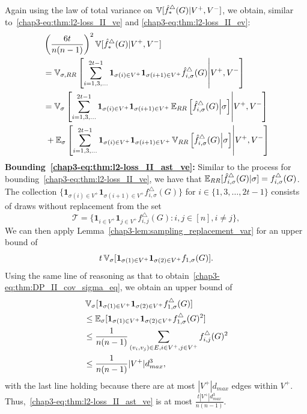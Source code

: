 Again using the law of total variance on $\operatorname{\mathbb{V}}[\hat{f}_*^\triangle(G)|V^+,V^-]$, we
obtain, similar to~\eqref{chap3-eq:thm:l2-loss_II_ve} and \eqref{chap3-eq:thm:l2-loss_II_ev}:
\begin{align}
  &\left(\frac{6t}{n(n-1)}\right)^2\operatorname{\mathbb{V}}[\hat{f}_*^\triangle(G)|V^+,V^-] \nonumber \\
  &=\operatorname{\mathbb{V}}_{\sigma,RR}\left[\sum_{i=1,3,\ldots}^{2t-1} \textbf{1}_{\sigma(i)\in
  V^+}\textbf{1}_{\sigma(i+1) \in V^+} \hat{f}_{i,\sigma}^\triangle(G)\middle| V^+,V^-\right] \nonumber \\
  &=\operatorname{\mathbb{V}}_{\sigma} \left[ \sum_{i=1,3,\ldots}^{2t-1} \textbf{1}_{\sigma(i) \in
  V^+}\textbf{1}_{\sigma(i+1) \in V^+}\operatorname{\mathbb{E}}_{RR}\left[\hat{f}_{i,\sigma}^\triangle(G)\middle|
  \sigma \right]\middle| V^+,V^-\right]\label{chap3-eq:thm:l2-loss_II_ast_ve} \\
  &\hspace{1mm} +\operatorname{\mathbb{E}}_{\sigma} \left[\sum_{i=1,3,\ldots}^{2t-1}\textbf{1}_{\sigma(i) \in
  V^+}\textbf{1}_{\sigma(i+1) \in V^+}\operatorname{\mathbb{V}}_{RR}\left[\hat{f}_{i,\sigma}^\triangle(G)\middle|
  \sigma \right]\middle| V^+,V^-\right]\label{chap3-eq:thm:l2-loss_II_ast_ev}
\end{align}
\noindent\textbf{Bounding~\eqref{chap3-eq:thm:l2-loss_II_ast_ve}:}
Similar to the process for bounding~\eqref{chap3-eq:thm:l2-loss_II_ve}, we have that
$\operatorname{\mathbb{E}}_{RR}[\hat{f}_{i,\sigma}^\triangle(G)|\sigma] = f_{i,\sigma}^\triangle(G)$. The
collection $\{\textbf{1}_{\sigma(i) \in V^+}\textbf{1}_{\sigma(i+1)\in V^+}
\allowbreak f_{i,\sigma}^\triangle(G) \}$ for $i \in \{1, 3, \ldots, 2t-1\}$ consists of draws without replacement from the set
\[
  \mathcal{T} = \{\textbf{1}_{i \in V^+} \textbf{1}_{j \in V^+}
  f_{i,j}^\triangle(G) : i,j \in [n], i \neq j\},
\]
We can then apply Lemma~\ref{chap3-lem:sampling_replacement_var} for
an upper bound of
\[t \operatorname{\mathbb{V}}_\sigma[\textbf{1}_{\sigma(1)\in
V^+}\textbf{1}_{\sigma(2) \in V^+}f_{1,\sigma}(G)].\] Using the same line of
reasoning as that to obtain~\eqref{chap3-eq:thm:DP_II_cov_sigma_eq}, we obtain an
upper bound of
\begin{align*}
  &\operatorname{\mathbb{V}}_\sigma[\textbf{1}_{\sigma(1)\in
  V^+}\textbf{1}_{\sigma(2) \in V^+}f^\triangle_{1,\sigma}(G)] \\
  &\leq
  \operatorname{\mathbb{E}}_\sigma[\textbf{1}_{\sigma(1)\in
  V^+}\textbf{1}_{\sigma(2) \in V^+}f^\triangle_{1,\sigma}(G)^2] \\
  &\leq \frac{1}{n(n-1)} \sum_{(v_i,v_j) \in E, i \in V^+, j \in V^+}
  f_{i,j}^\triangle(G)^2 \\
  &\leq \frac{1}{n(n-1)} |V^+| d_{max}^3,
\end{align*}
with the last line holding because there are at most $|V^+| d_{max}$ edges
within $V^+$. Thus,~\eqref{chap3-eq:thm:l2-loss_II_ast_ve} is at most
$\frac{t|V^+|d_{max}^3}{n(n-1)}$.


